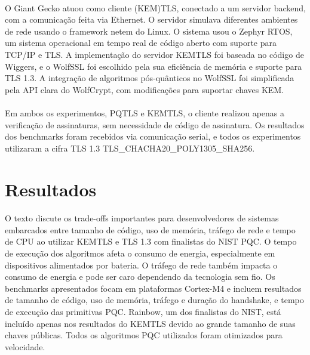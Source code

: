 \documentclass[letterpaper,11pt,leqno]{article}
\begin{document}
\paragraph{}
O Giant Gecko atuou como cliente (KEM)TLS, conectado a um servidor backend, com
a comunicação feita via Ethernet. O servidor simulava diferentes ambientes de
rede usando o framework netem do Linux. O sistema usou o Zephyr RTOS, um sistema
operacional em tempo real de código aberto com suporte para TCP/IP e TLS. A
implementação do servidor KEMTLS foi baseada no código de Wiggers, e o WolfSSL
foi escolhido pela sua eficiência de memória e suporte para TLS 1.3. A
integração de algoritmos pós-quânticos no WolfSSL foi simplificada pela API
clara do WolfCrypt, com modificações para suportar chaves KEM.

\paragraph{}
Em ambos os experimentos, PQTLS e KEMTLS, o cliente realizou apenas a
verificação de assinaturas, sem necessidade de código de assinatura. Os
resultados dos benchmarks foram recebidos via comunicação serial, e todos os
experimentos utilizaram a cifra TLS 1.3 TLS\_CHACHA20\_POLY1305\_SHA256.

\section{Resultados}

\paragraph{}
O texto discute os trade-offs importantes para desenvolvedores de sistemas
embarcados entre tamanho de código, uso de memória, tráfego de rede e tempo de
CPU ao utilizar KEMTLS e TLS 1.3 com finalistas do NIST PQC. O tempo de execução
dos algoritmos afeta o consumo de energia, especialmente em dispositivos
alimentados por bateria. O tráfego de rede também impacta o consumo de energia e
pode ser caro dependendo da tecnologia sem fio. Os benchmarks apresentados focam
em plataformas Cortex-M4 e incluem resultados de tamanho de código, uso de
memória, tráfego e duração do handshake, e tempo de execução das primitivas PQC.
Rainbow, um dos finalistas do NIST, está incluído apenas nos resultados do
KEMTLS devido ao grande tamanho de suas chaves públicas. Todos os algoritmos PQC
utilizados foram otimizados para velocidade.

\end{document}
